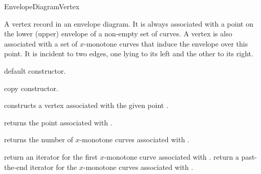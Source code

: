 
\ccRefPageBegin

\begin{ccRefConcept}{EnvelopeDiagramVertex}

\ccDefinition

A vertex record in an envelope diagram. It is always associated with a point
on the lower (upper) envelope of a non-empty set of curves. A vertex is also
associated with a set of $x$-monotone curves that induce the envelope
over this point. It is incident to two edges, one lying to its
left and the other to its right.

\ccTypes



\ccGlue
{} 

\ccCreation
{}

    {default constructor.}
    
    {copy constructor.}

    {constructs a vertex associated with the given point .}
        
\ccAccessFunctions

    {returns the point associated with \ccVar.}

    {returns the number of $x$-monotone curves associated with \ccVar.}

    {return an iterator for the first $x$-monotone curve associated with \ccVar.}
\ccGlue
{}
    {return a past-the-end iterator for the $x$-monotone curves associated with \ccVar.}


\end{ccRefConcept}
